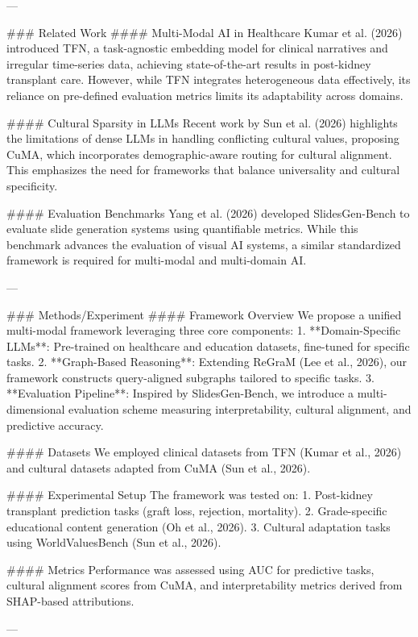---

### Related Work  
#### Multi-Modal AI in Healthcare  
Kumar et al. (2026) introduced TFN, a task-agnostic embedding model for clinical narratives and irregular time-series data, achieving state-of-the-art results in post-kidney transplant care. However, while TFN integrates heterogeneous data effectively, its reliance on pre-defined evaluation metrics limits its adaptability across domains.  

#### Cultural Sparsity in LLMs  
Recent work by Sun et al. (2026) highlights the limitations of dense LLMs in handling conflicting cultural values, proposing CuMA, which incorporates demographic-aware routing for cultural alignment. This emphasizes the need for frameworks that balance universality and cultural specificity.  

#### Evaluation Benchmarks  
Yang et al. (2026) developed SlidesGen-Bench to evaluate slide generation systems using quantifiable metrics. While this benchmark advances the evaluation of visual AI systems, a similar standardized framework is required for multi-modal and multi-domain AI.  

---

### Methods/Experiment  
#### Framework Overview  
We propose a unified multi-modal framework leveraging three core components:  
1. **Domain-Specific LLMs**: Pre-trained on healthcare and education datasets, fine-tuned for specific tasks.  
2. **Graph-Based Reasoning**: Extending ReGraM (Lee et al., 2026), our framework constructs query-aligned subgraphs tailored to specific tasks.  
3. **Evaluation Pipeline**: Inspired by SlidesGen-Bench, we introduce a multi-dimensional evaluation scheme measuring interpretability, cultural alignment, and predictive accuracy.  

#### Datasets  
We employed clinical datasets from TFN (Kumar et al., 2026) and cultural datasets adapted from CuMA (Sun et al., 2026).  

#### Experimental Setup  
The framework was tested on:  
1. Post-kidney transplant prediction tasks (graft loss, rejection, mortality).  
2. Grade-specific educational content generation (Oh et al., 2026).  
3. Cultural adaptation tasks using WorldValuesBench (Sun et al., 2026).  

#### Metrics  
Performance was assessed using AUC for predictive tasks, cultural alignment scores from CuMA, and interpretability metrics derived from SHAP-based attributions.  

---

